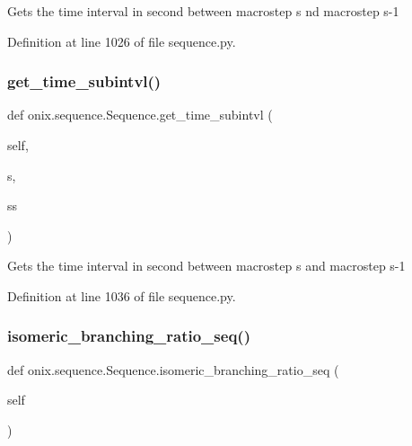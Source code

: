 \begin{DoxyVerb}Gets the time interval in second between macrostep s nd macrostep s-1
\end{DoxyVerb}
 

Definition at line 1026 of file sequence.\+py.

\mbox{\label{classonix_1_1sequence_1_1Sequence_a389b1c44ba38aba5e575c098ff0220c8}} 
\subsubsection{\texorpdfstring{get\+\_\+time\+\_\+subintvl()}{get\_time\_subintvl()}}
{\footnotesize\ttfamily def onix.\+sequence.\+Sequence.\+get\+\_\+time\+\_\+subintvl (\begin{DoxyParamCaption}\item[{}]{self,  }\item[{}]{s,  }\item[{}]{ss }\end{DoxyParamCaption})}

\begin{DoxyVerb}Gets the time interval in second between macrostep s and macrostep s-1
\end{DoxyVerb}
 

Definition at line 1036 of file sequence.\+py.

\mbox{\label{classonix_1_1sequence_1_1Sequence_ae7c83b9da70a30c2411671f5b12fbc7d}} 
\subsubsection{\texorpdfstring{isomeric\+\_\+branching\+\_\+ratio\+\_\+seq()}{isomeric\_branching\_ratio\_seq()}\hspace{0.1cm}{\footnotesize\ttfamily [1/2]}}
{\footnotesize\ttfamily def onix.\+sequence.\+Sequence.\+isomeric\+\_\+branching\+\_\+ratio\+\_\+seq (\begin{DoxyParamCaption}\item[{}]{self }\end{DoxyParamCaption})}

